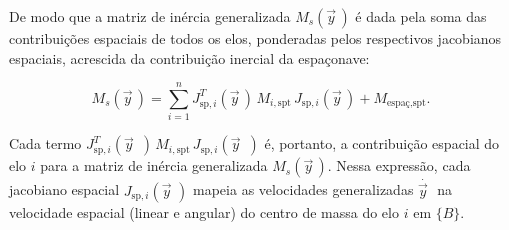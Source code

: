 De modo que a matriz de inércia generalizada $M_s(\vec y\, )$ é dada pela soma das
contribuições espaciais de todos os elos, ponderadas pelos respectivos
jacobianos espaciais, acrescida da contribuição inercial da espaçonave:

\begin{equation}
M_s(\vec y\, ) =
\sum_{i=1}^{n}
J_{\text{sp},i}^{T}(\vec y\, )\,
M_{i,\text{spt}}\,
J_{\text{sp},i}(\vec y\, )
+
M_{\text{espaç},\text{spt}}.
\label{eq_Ms_total_formula}
\end{equation}

Cada termo
$J_{\text{sp},i}^{T}(\vec y\, \, \, )\,M_{i,\text{spt}}\,J_{\text{sp},i}(\vec y\, \, \, )$
é, portanto, a contribuição espacial do elo $i$ para a matriz de inércia
generalizada $M_s(\vec y\, )$.
Nessa expressão, cada jacobiano espacial $J_{\text{sp},i}(\vec y\, \, )$ mapeia as velocidades generalizadas $\dot{\vec y\, \, }$ na velocidade espacial (linear e angular) do centro de massa do elo $i$ em $\{B\}$.